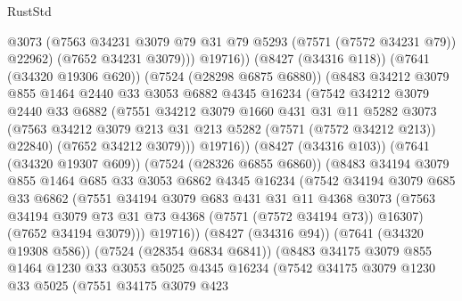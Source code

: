 \begin{lexlean}{RustStd}
\begin{coremodule}
                        @3073
                        (@7563 @34231 @3079 @79 @31 @79 @5293 (@7571 (@7572 @34231 @79)) @22962)
                        (@7652 @34231 @3079)))
                    @19716))
                (@8427 (@34316 @118))
                (@7641 (@34320 @19306 @620))
                (@7524 (@28298 @6875 @6880))
                (@8483
                  @34212
                  @3079
                  @855
                  @1464
                  @2440
                  @33
                  @3053
                  @6882
                  @4345
                  @16234
                  (@7542
                    @34212
                    @3079
                    @2440
                    @33
                    @6882
                    (@7551
                      @34212
                      @3079
                      @1660
                      @431
                      @31
                      @11
                      @5282
                      @3073
                      (@7563 @34212 @3079 @213 @31 @213 @5282 (@7571 (@7572 @34212 @213)) @22840)
                      (@7652 @34212 @3079)))
                  @19716))
              (@8427 (@34316 @103))
              (@7641 (@34320 @19307 @609))
              (@7524 (@28326 @6855 @6860))
              (@8483
                @34194
                @3079
                @855
                @1464
                @685
                @33
                @3053
                @6862
                @4345
                @16234
                (@7542
                  @34194
                  @3079
                  @685
                  @33
                  @6862
                  (@7551
                    @34194
                    @3079
                    @683
                    @431
                    @31
                    @11
                    @4368
                    @3073
                    (@7563 @34194 @3079 @73 @31 @73 @4368 (@7571 (@7572 @34194 @73)) @16307)
                    (@7652 @34194 @3079)))
                @19716))
            (@8427 (@34316 @94))
            (@7641 (@34320 @19308 @586))
            (@7524 (@28354 @6834 @6841))
            (@8483
              @34175
              @3079
              @855
              @1464
              @1230
              @33
              @3053
              @5025
              @4345
              @16234
              (@7542
                @34175
                @3079
                @1230
                @33
                @5025
                (@7551
                  @34175
                  @3079
                  @423

\end{coremodule}
\end{lexlean}
